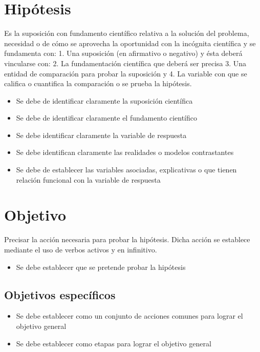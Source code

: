     \section{Hipótesis}
    
    Es la suposición con fundamento científico relativa a la solución del problema, necesidad o de cómo se aprovecha la oportunidad con la incógnita científica y se fundamenta con: 1. Una suposición (en afirmativo o negativo) y ésta deberá vincularse con:
    2. La fundamentación científica que deberá ser precisa 3. Una entidad de comparación para probar la suposición y
    4. La variable con que se califica o cuantifica la comparación o se prueba la hipótesis.
    
    \begin{itemize}
        \item Se debe de identificar claramente la suposición científica
        \item Se debe de identificar claramente el fundamento científico
        \item Se debe identificar claramente la variable de respuesta
        \item Se debe identifican claramente las realidades o modelos contrastantes
        \item Se debe de establecer las variables asociadas, explicativas o que tienen relación funcional con la variable de respuesta
    \end{itemize}
    \section{Objetivo}
    
    Precisar la acción necesaria para probar la hipótesis. Dicha acción se establece mediante el uso de verbos activos y en infinitivo.
    \begin{itemize}
        \item Se debe establecer que se pretende probar la hipótesis
    \end{itemize}
    
    \subsection{Objetivos específicos }
    
    \begin{itemize}
        \item Se debe establecer como un conjunto de acciones comunes para lograr el objetivo general
        \item Se debe establecer como etapas para lograr el objetivo general
    \end{itemize}
    
